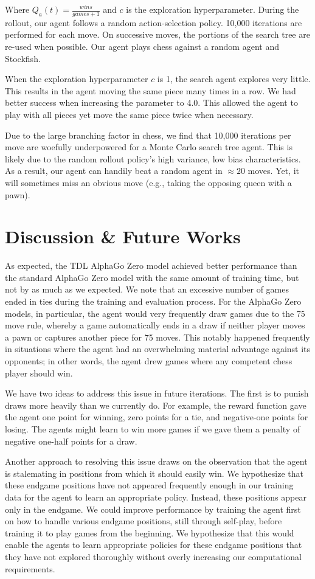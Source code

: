 \documentclass[12pt]{turabian-researchpaper}
\begin{document}
Where $Q_a(t) = \frac{wins}{games + 1}$ and $c$ is the exploration hyperparameter. During the rollout, our agent follows a random action-selection policy. 10,000 iterations are performed for each move. On successive moves, the portions of the search tree are re-used when possible. Our agent plays chess against a random agent and Stockfish.

When the exploration hyperparameter $c$ is  1, the search agent explores very little. This results in the agent moving the same piece many times in a row. We had better success when increasing the parameter to 4.0. This allowed the agent to play with all pieces yet move the same piece twice when necessary. 

Due to the large branching factor in chess, we find that 10,000 iterations per move are woefully underpowered for a Monte Carlo search tree agent. This is likely due to the random rollout policy's high variance, low bias characteristics. As a result, our agent can handily beat a random agent in $\approx20$ moves. Yet, it will sometimes miss an obvious move (e.g., taking the opposing queen with a pawn). 

\section{Discussion \& Future Works}
As expected, the TDL AlphaGo Zero model achieved better performance than the standard AlphaGo Zero model with the same amount of training time, but not by as much as we expected. We note that an excessive number of games ended in ties during the training and evaluation process. For the AlphaGo Zero models, in particular, the agent would very frequently draw games due to the 75 move rule, whereby a game automatically ends in a draw if neither player moves a pawn or captures another piece for 75 moves. This notably happened frequently in situations where the agent had an overwhelming material advantage against its opponents; in other words, the agent drew games where any competent chess player should win. 

We have two ideas to address this issue in future iterations. The first is to punish draws more heavily than we currently do. For example, the reward function gave the agent one point for winning, zero points for a tie, and negative-one points for losing. The agents might learn to win more games if we gave them a penalty of negative one-half points for a draw. 

Another approach to resolving this issue draws on the observation that the agent is stalemating in positions from which it should easily win. We hypothesize that these endgame positions have not appeared frequently enough in our training data for the agent to learn an appropriate policy. Instead, these positions appear only in the endgame. We could improve performance by training the agent first on how to handle various endgame positions, still through self-play, before training it to play games from the beginning. We hypothesize that this would enable the agents to learn appropriate policies for these endgame positions that they have not explored thoroughly without overly increasing our computational requirements. 


\clearpage
\printbibliography[title={References}]
\end{document}
